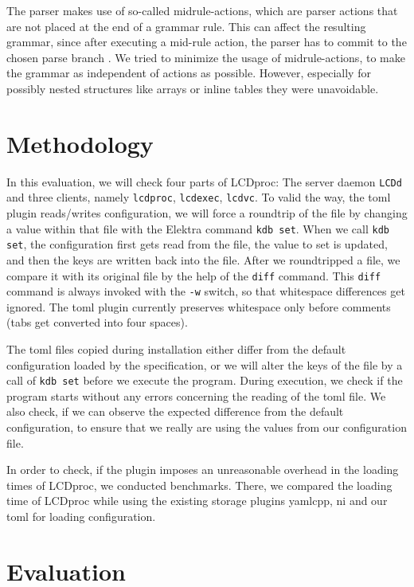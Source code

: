 \documentclass[draft,final]{vutinfth} %
\begin{document}
The parser makes use of so-called midrule-actions, which are parser actions that are not placed at the end of a grammar rule.
This can affect the resulting grammar, since after executing a mid-rule action, the parser has to commit to the chosen parse branch \cite{bisonmidruleconflicts}.
We tried to minimize the usage of midrule-actions, to make the grammar as independent of actions as possible.
However, especially for possibly nested structures like arrays or inline tables they were unavoidable.

\chapter{Methodology}
In this evaluation, we will check four parts of LCDproc: The server daemon \texttt{LCDd} and three clients, namely \texttt{lcdproc}, \texttt{lcdexec}, \texttt{lcdvc}.
To valid the way, the \acrshort{toml} plugin reads/writes configuration, we will force a roundtrip of the file by changing a value within that file with the Elektra command \texttt{kdb set}.
When we call \texttt{kdb set}, the configuration first gets read from the file, the value to set is updated, and then the keys are written back into the file.
After we roundtripped a file, we compare it with its original file by the help of the \texttt{diff} command.
This \texttt{diff} command is always invoked with the \texttt{-w} switch, so that whitespace differences get ignored.
The \acrshort{toml} plugin currently preserves whitespace only before comments (tabs get converted into four spaces).

The \acrshort{toml} files copied during installation either differ from the default configuration loaded by the specification, or we will alter the keys of the file by a call of \texttt{kdb set} before we execute the program.
During execution, we check if the program starts without any errors concerning the reading of the \acrshort{toml} file.
We also check, if we can observe the expected difference from the default configuration, to ensure that we really are using the values from our configuration file.

In order to check, if the plugin imposes an unreasonable overhead in the loading times of LCDproc, we conducted benchmarks.
There, we compared the loading time of LCDproc while using the existing storage plugins yamlcpp, ni and our \acrshort{toml} for loading configuration.


\chapter{Evaluation}
\end{document}
